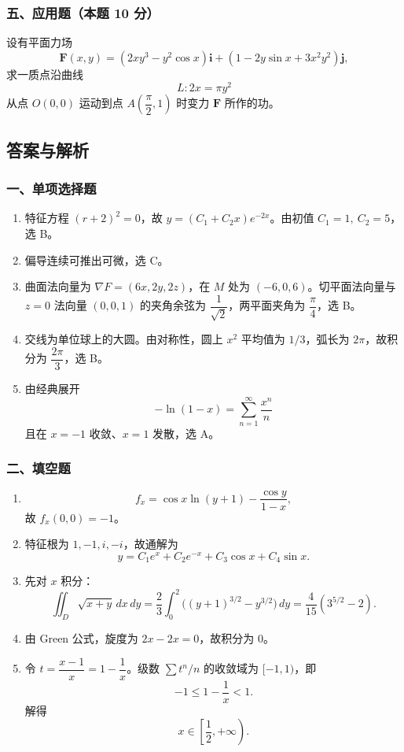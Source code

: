 \subsubsection*{五、应用题（本题 10 分）}
设有平面力场
\[
\mathbf F(x,y)=(2xy^3-y^2\cos x)\mathbf i+(1-2y\sin x+3x^2y^2)\mathbf j,
\]
求一质点沿曲线
\[
L:2x=\pi y^2
\]
从点 $O(0,0)$ 运动到点 $A\!\left(\dfrac\pi2,1\right)$ 时变力 $\mathbf F$ 所作的功。

\subsection{答案与解析}

\subsubsection*{一、单项选择题}
\begin{enumerate}
  \item 特征方程 $(r+2)^2=0$，故 $y=(C_1+C_2x)e^{-2x}$。由初值 $C_1=1,\ C_2=5$，选 B。
  \item 偏导连续可推出可微，选 C。
  \item 曲面法向量为 $\nabla F=(6x,2y,2z)$，在 $M$ 处为 $(-6,0,6)$。切平面法向量与 $z=0$ 法向量 $(0,0,1)$ 的夹角余弦为 $\dfrac1{\sqrt2}$，两平面夹角为 $\dfrac\pi4$，选 B。
  \item 交线为单位球上的大圆。由对称性，圆上 $x^2$ 平均值为 $1/3$，弧长为 $2\pi$，故积分为 $\dfrac{2\pi}{3}$，选 B。
  \item 由经典展开
  \[
  -\ln(1-x)=\sum_{n=1}^{\infty}\frac{x^n}{n}
  \]
  且在 $x=-1$ 收敛、$x=1$ 发散，选 A。
\end{enumerate}

\subsubsection*{二、填空题}
\begin{enumerate}
  \item
  \[
  f_x=\cos x\ln(y+1)-\frac{\cos y}{1-x},
  \]
  故 $f_x(0,0)=-1$。
  \item 特征根为 $1,-1,i,-i$，故通解为
  \[
  y=C_1e^x+C_2e^{-x}+C_3\cos x+C_4\sin x.
  \]
  \item 先对 $x$ 积分：
  \[
  \iint_D\sqrt{x+y}\,dx\,dy
  =\frac23\int_0^2\bigl((y+1)^{3/2}-y^{3/2}\bigr)\,dy
  =\frac4{15}(3^{5/2}-2).
  \]
  \item 由 Green 公式，旋度为 $2x-2x=0$，故积分为 $0$。
  \item 令 $t=\dfrac{x-1}{x}=1-\dfrac1x$。级数 $\sum t^n/n$ 的收敛域为 $[-1,1)$，即
  \[
  -1\le1-\frac1x<1.
  \]
  解得
  \[
  x\in\left[\frac12,+\infty\right).
  \]
\end{enumerate}

